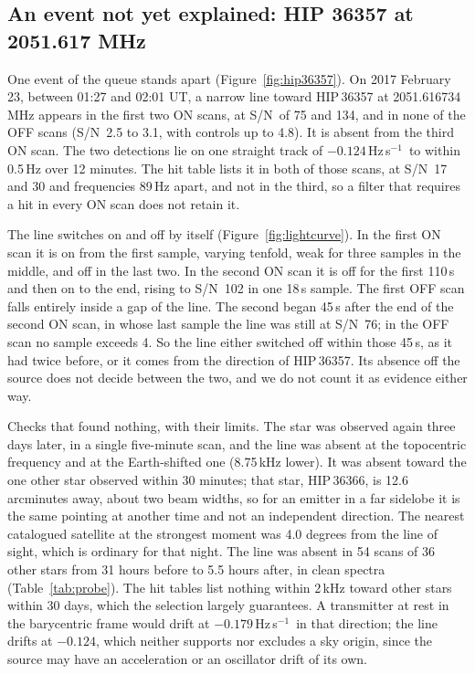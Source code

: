 \documentclass[twocolumn]{aastex631}
\newcommand{\hzs}{Hz\,s$^{-1}$}
\newcommand{\sn}{S/N}
\begin{document}
\subsection{An event not yet explained: HIP 36357 at 2051.617 MHz} \label{sec:hip36357}

One event of the queue stands apart (Figure~\ref{fig:hip36357}). On 2017
February 23, between 01:27 and 02:01 UT, a narrow line toward HIP\,36357 at
2051.616734\,MHz appears in the first two ON scans, at \sn\ of 75 and 134,
and in none of the OFF scans (\sn\ 2.5 to 3.1, with controls up to 4.8). It
is absent from the third ON scan. The two detections lie on one straight
track of $-0.124$\,\hzs\ to within 0.5\,Hz over 12 minutes. The hit table
lists it in both of those scans, at \sn\ 17 and 30 and frequencies 89\,Hz
apart, and not in the third, so a filter that requires a hit in every ON
scan does not retain it.

The line switches on and off by itself (Figure~\ref{fig:lightcurve}). In
the first ON scan it is on from the first sample, varying tenfold, weak for
three samples in the middle, and off in the last two. In the second ON scan
it is off for the first 110\,s and then on to the end, rising to \sn\ 102
in one 18\,s sample. The first OFF scan falls entirely inside a gap of the
line. The second began 45\,s after the end of the second ON scan, in whose
last sample the line was still at \sn\ 76; in the OFF scan no sample
exceeds 4. So the line either switched off within those 45\,s, as it had
twice before, or it comes from the direction of HIP\,36357. Its absence off
the source does not decide between the two, and we do not count it as
evidence either way.

Checks that found nothing, with their limits. The star was observed again
three days later, in a single five-minute scan, and the line was absent at
the topocentric frequency and at the Earth-shifted one (8.75\,kHz lower).
It was absent toward the one other star observed within 30 minutes; that
star, HIP\,36366, is 12.6 arcminutes away, about two beam widths, so for an
emitter in a far sidelobe it is the same pointing at another time and not
an independent direction. The nearest catalogued satellite at the strongest
moment was 4.0 degrees from the line of sight, which is ordinary for that
night. The line was absent in 54 scans of 36 other stars from 31 hours
before to 5.5 hours after, in clean spectra (Table~\ref{tab:probe}). The
hit tables list nothing within 2\,kHz toward other stars within 30 days,
which the selection largely guarantees. A transmitter at rest in the
barycentric frame would drift at $-0.179$\,\hzs\ in that direction; the
line drifts at $-0.124$, which neither supports nor excludes a sky origin,
since the source may have an acceleration or an oscillator drift of its
own.
\end{document}
